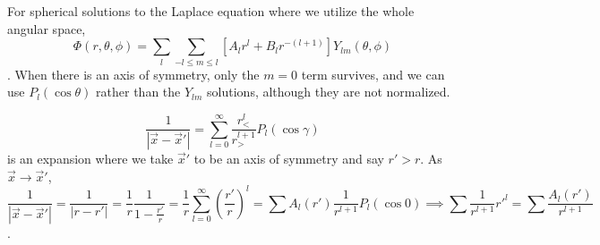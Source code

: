 \documentclass[a4paper,twoside,master.tex]{subfiles}
\begin{document}

For spherical solutions to the Laplace equation where we utilize the whole angular space,
\begin{equation}
    \Phi(r,\theta,\phi) = \sum_{l}\sum_{-l\leq m\leq l} [A_l r^l + B_l r^{-(l+1)}]Y_{lm}(\theta,\phi)
\end{equation}.
When there is an axis of symmetry, only the $m=0$ term survives, and we can use $P_l(\cos\theta)$ rather than the $Y_{lm}$ solutions, although they are not normalized.

\begin{equation}
    \frac{1}{|\vec{x}-\vec{x}'|} = \sum_{l=0}^\infty \frac{r_<^l}{r_>^{l+1}}P_l(\cos\gamma)
\end{equation}
is an expansion where we take $\vec{x}'$ to be an axis of symmetry and say $r'>r$. As $\vec{x}\to\vec{x}'$,
\begin{equation}
    \frac{1}{|\vec{x}-\vec{x}'|} = \frac{1}{|r-r'|} = \frac{1}{r}\frac{1}{1-\frac{r'}{r}} = \frac{1}{r}\sum_{l=0}^\infty\left(\frac{r'}{r}\right)^l = \sum A_l(r')\frac{1}{r^{l+1}}P_l(\cos 0)\implies\sum\frac{1}{r^{l+1}}r'^l = \sum\frac{A_l(r')}{r^{l+1}}
\end{equation}.
\end{document}
